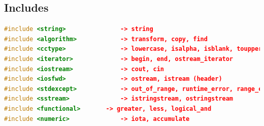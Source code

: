 \subsection{Includes}
\begin{lstlisting}[language=C++]
#include <string>				-> string
#include <algorithm> 			-> transform, copy, find
#include <cctype> 				-> lowercase, isalpha, isblank, toupper
#include <iterator> 			-> begin, end, ostream_iterator
#include <iostream> 			-> cout, cin
#include <iosfwd>				-> ostream, istream (header)
#include <stdexcept>			-> out_of_range, runtime_error, range_error
#include <sstream> 				-> istringstream, ostringstream
#include <functional> 		-> greater, less, logical_and
#include <numeric>				-> iota, accumulate
\end{lstlisting}



\clearpage

